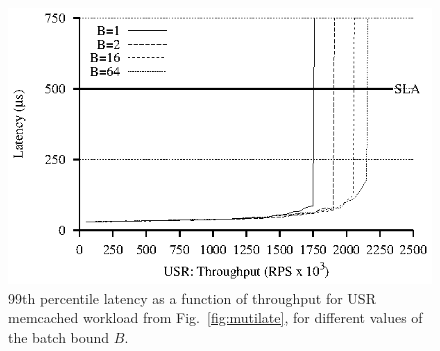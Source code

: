 \begin{figure}
\begin{centering}
\includegraphics{figs/batch-mutilate.eps}
\caption{99th percentile latency as a function of throughput for USR memcached workload from Fig.~\ref{fig:mutilate}, for different values of the batch bound $B$.}
\label{fig:batch-mutilate}
\end{centering}
\end{figure}


